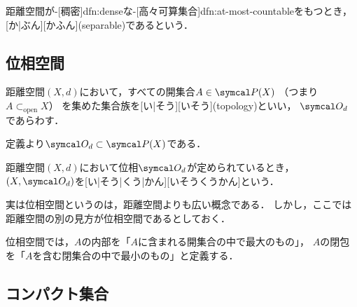 \documentclass[../sotsu.tex]{subfiles}
\begin{document}
\begin{definition}
    \label{dfn:separable}
    距離空間が-[稠密]{dfn:dense}な-[高々可算集合]{dfn:at-most-countable}をもつとき，
    [か|ぶん][かふん](separable)であるという．
\end{definition}




\subsection{位相空間}

\begin{definition}
    \label{dfn:topology}
    距離空間$(X, d)$において，すべての開集合$A \in \pset(X)$
    （つまり$A \subset_{\text{open}} X$）
    を集めた集合族を[い|そう][いそう](topology)といい，
    $\topology_d$であらわす．
\end{definition}

定義より$\topology_d \subset \pset(X)$である．

\begin{definition}
    \label{dfn:topological-space}
    距離空間$(X, d)$において位相$\topology_d$が定められているとき，
    $(X, \topology_d)$を[い|そう|くう|かん][いそうくうかん]という．
\end{definition}

実は位相空間というのは，距離空間よりも広い概念である．
しかし，ここでは距離空間の別の見方が位相空間であるとしておく．

位相空間では，$A$の内部を「$A$に含まれる開集合の中で最大のもの」，
$A$の閉包を「$A$を含む閉集合の中で最小のもの」と定義する．



\subsection{コンパクト集合}



\end{document}
